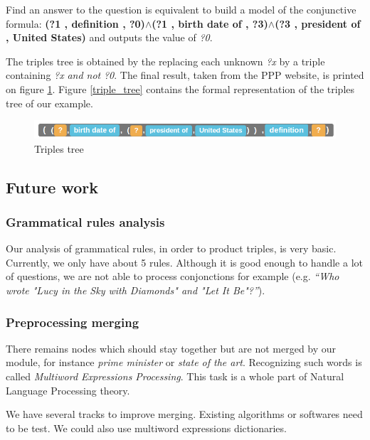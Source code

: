 Find an answer to the question is equivalent to build a model of the conjunctive formula: \textbf{(?1 , definition , ?0)$\wedge$(?1 , birth date of , ?3)$\wedge$(?3 , president of , United States)} and outputs the value of \textit{?0}.

The triples tree is obtained by the replacing each unknown \textit{?x} by a triple containing \textit{?x} \textit{and not} \textit{?0}. The final result, taken from the PPP website, is printed on figure \ref{tree_four}. Figure \ref{triple_tree} contains the formal representation of the triples tree of our example.

\begin{figure}[!h]
  \centering
  \label{tree_four}
    \includegraphics[scale=0.5]{../examples_NLP_classical/final_result.png}
  \caption{Triples tree}
\end{figure}


\subsection{Future work}

\subsubsection{Grammatical rules analysis}

Our analysis of grammatical rules, in order to product triples, is very basic. Currently, we only have about 5 rules. Although it is good enough to handle a lot of questions, we are not able to process conjonctions for example (e.g. \textit{``Who wrote "Lucy in the Sky with Diamonds" and "Let It Be"?''}).

\subsubsection{Preprocessing merging}

There remains nodes which should stay together but are not merged by our module, for instance \emph{prime minister} or \emph{state of the art}. Recognizing such words is called \emph{Multiword Expressions Processing}. This task is a whole part of Natural Language Processing theory. 

We have several tracks to improve merging. Existing algorithms or softwares need to be test. We could also use multiword expressions dictionaries.

